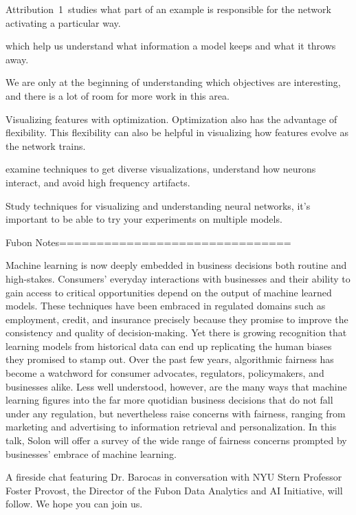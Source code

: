 Attribution 1 studies what part of an example is responsible for the network activating a particular way.

which help us understand what information a model keeps and what it throws away. 

We are only at the beginning of understanding which objectives are interesting, and there is a lot of room for more work in this area.

Visualizing features with optimization. Optimization also has the advantage of flexibility. This flexibility can also be helpful in visualizing how features evolve as the network trains. 

examine techniques to get diverse visualizations, understand how neurons interact, and avoid high frequency artifacts.

Study techniques for visualizing and understanding neural networks, it's important to be able to try your experiments on multiple models.

Fubon Notes===============================

Machine learning is now deeply embedded in business decisions both routine and high-stakes. Consumers' everyday interactions with businesses and their ability to gain access to critical opportunities depend on the output of machine learned models. These techniques have been embraced in regulated domains such as employment, credit, and insurance precisely because they promise to improve the consistency and quality of decision-making. Yet there is growing recognition that learning models from historical data can end up replicating the human biases they promised to stamp out. Over the past few years, algorithmic fairness has become a watchword for consumer advocates, regulators, policymakers, and businesses alike. Less well understood, however, are the many ways that machine learning figures into the far more quotidian business decisions that do not fall under any regulation, but nevertheless raise concerns with fairness, ranging from marketing and advertising to information retrieval and personalization. In this talk, Solon will offer a survey of the wide range of fairness concerns prompted by businesses' embrace of machine learning.

A fireside chat featuring Dr. Barocas in conversation with NYU Stern Professor Foster Provost, the Director of the Fubon Data Analytics and AI Initiative, will follow. We hope you can join us. 
